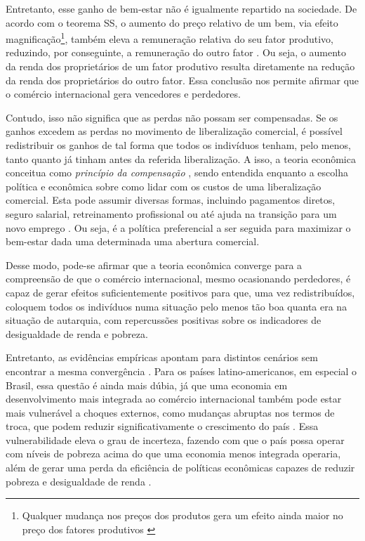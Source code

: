 Entretanto, esse ganho de bem-estar não é igualmente repartido na sociedade. De acordo com o teorema SS, o aumento do preço relativo de um bem, via efeito magnificação\footnote{Qualquer mudança nos preços dos produtos gera um efeito ainda maior no preço dos fatores produtivos \cite{jones65}}, também eleva a remuneração relativa do seu fator produtivo, reduzindo, por conseguinte, a remuneração do outro fator \cite{stolper41}. Ou seja, o aumento da renda dos proprietários de um fator produtivo resulta diretamente na redução da renda dos proprietários do outro fator. Essa conclusão nos permite afirmar que o comércio internacional gera vencedores e perdedores.

Contudo, isso não significa que as perdas não possam ser compensadas. Se os ganhos excedem as perdas no movimento de liberalização comercial, é possível redistribuir os ganhos de tal forma que todos os indivíduos tenham, pelo menos, tanto quanto já tinham antes da referida liberalização. A isso, a teoria econômica conceitua como \textit{princípio da compensação} \cite{irwin98}, sendo entendida enquanto a escolha política e econômica sobre como lidar com os custos de uma liberalização comercial. Esta pode assumir diversas formas, incluindo pagamentos diretos, seguro salarial, retreinamento profissional ou até ajuda na transição para um novo emprego \cite{kolben21}. Ou seja, é a política preferencial a ser seguida para maximizar o bem-estar dada uma determinada uma abertura comercial.

Desse modo, pode-se afirmar que a teoria econômica converge para a compreensão de que o comércio internacional, mesmo ocasionando perdedores, é capaz de gerar efeitos suficientemente positivos para que, uma vez redistribuídos, coloquem todos os indivíduos numa situação pelo menos tão boa quanta era na situação de autarquia, com repercussões positivas sobre os indicadores de desigualdade de renda e pobreza.

Entretanto, as evidências empíricas apontam para distintos cenários sem encontrar a mesma convergência \cite{winters04}. Para os países latino-americanos, em especial o Brasil, essa questão é ainda mais dúbia, já que uma economia em desenvolvimento mais integrada ao comércio internacional também pode estar mais vulnerável a choques externos, como mudanças abruptas nos termos de troca, que podem reduzir significativamente o crescimento do país \cite{bannisterthugge01}. Essa vulnerabilidade eleva o grau de incerteza, fazendo com que o país possa operar com níveis de pobreza acima do que uma economia menos integrada operaria, além de gerar uma perda da eficiência de políticas econômicas capazes de reduzir pobreza e desigualdade de renda \cite{winters02}.

